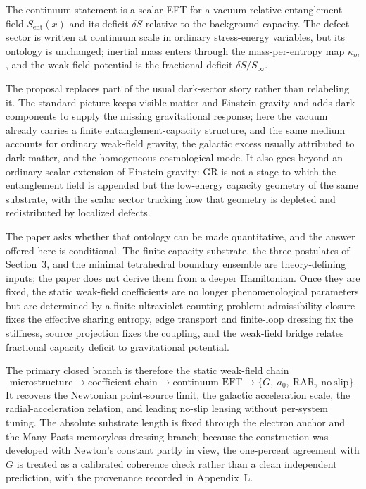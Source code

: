 \documentclass[11pt]{article}
\begin{document}
The continuum statement is a scalar EFT for a vacuum-relative entanglement field $S_{\mathrm{ent}}(x)$ and its deficit $\delta S$ relative to the background capacity. The defect sector is written at continuum scale in ordinary stress-energy variables, but its ontology is unchanged; inertial mass enters through the mass-per-entropy map $\kappa_m$, and the weak-field potential is the fractional deficit $\delta S/S_\infty$.

The proposal replaces part of the usual dark-sector story rather than relabeling it. The standard picture keeps visible matter and Einstein gravity and adds dark components to supply the missing gravitational response; here the vacuum already carries a finite entanglement-capacity structure, and the same medium accounts for ordinary weak-field gravity, the galactic excess usually attributed to dark matter, and the homogeneous cosmological mode. It also goes beyond an ordinary scalar extension of Einstein gravity: GR is not a stage to which the entanglement field is appended but the low-energy capacity geometry of the same substrate, with the scalar sector tracking how that geometry is depleted and redistributed by localized defects.

The paper asks whether that ontology can be made quantitative, and the answer offered here is conditional. The finite-capacity substrate, the three postulates of Section~3, and the minimal tetrahedral boundary ensemble are theory-defining inputs; the paper does not derive them from a deeper Hamiltonian. Once they are fixed, the static weak-field coefficients are no longer phenomenological parameters but are determined by a finite ultraviolet counting problem: admissibility closure fixes the effective sharing entropy, edge transport and finite-loop dressing fix the stiffness, source projection fixes the coupling, and the weak-field bridge relates fractional capacity deficit to gravitational potential.

The primary closed branch is therefore the static weak-field chain
\[
\text{microstructure} \longrightarrow \text{coefficient chain} \longrightarrow \text{continuum EFT} \longrightarrow \{G,\ a_0,\ \mathrm{RAR},\ \mathrm{no\ slip}\}.
\]
It recovers the Newtonian point-source limit, the galactic acceleration scale, the radial-acceleration relation, and leading no-slip lensing without per-system tuning. The absolute substrate length is fixed through the electron anchor and the Many-Pasts memoryless dressing branch; because the construction was developed with Newton's constant partly in view, the one-percent agreement with $G$ is treated as a calibrated coherence check rather than a clean independent prediction, with the provenance recorded in Appendix~L.
\end{document}

